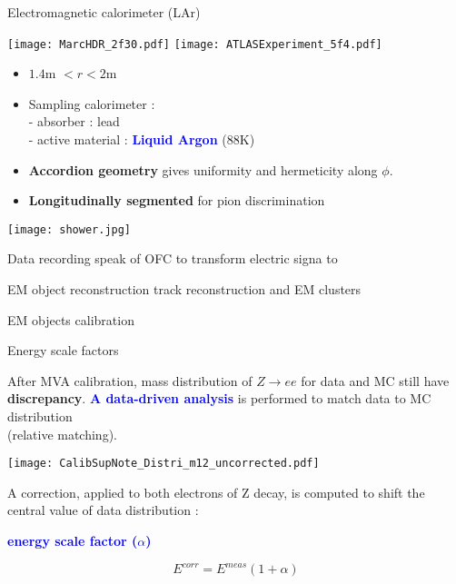 \documentclass[a4paper]{beamer}
\begin{document}
\begin{frame}{ Electromagnetic calorimeter (LAr) }
  \begin{minipage}{0.4\linewidth}
    \texttt{[image: MarcHDR\_2f30.pdf]}\newline
    \centering
    \texttt{[image: ATLASExperiment\_5f4.pdf]}
  \end{minipage}
  \hfill
  \begin{minipage}{0.59\linewidth}
    \begin{itemize}
    \item $1.4$m $<r<2$m
    \item Sampling calorimeter : \\
      - absorber : lead\\
      - active material : \textcolor{blue}{\bf Liquid Argon }($88$K)\\
    \item {\bf Accordion geometry} gives uniformity and hermeticity along $\phi$.
    \item {\bf Longitudinally segmented} for pion discrimination
      
    \end{itemize}
    \centering
    \texttt{[image: shower.jpg]}
  \end{minipage}
\end{frame}

\begin{frame}{Data recording}
  speak of OFC to transform electric signa to 
  \end{frame}
\begin{frame}{EM object reconstruction}
  track reconstruction and EM clusters
\end{frame}
\begin{frame}{EM objects calibration}
\end{frame}
\begin{frame}{Energy scale factors}
  \begin{minipage}{0.49\linewidth}
    After MVA calibration, mass distribution of $Z\rightarrow ee$ for data and MC still have \\{\bf discrepancy}.
    \newline
    \textcolor{blue}{\bf A data-driven analysis } is performed to match data to MC distribution \\(relative matching).
  \end{minipage}
  \hfill
  \begin{minipage}{0.49\linewidth}
    \texttt{[image: CalibSupNote\_Distri\_m12\_uncorrected.pdf]}
  \end{minipage}

A correction, applied to both electrons of Z decay, is computed to shift the central value of data distribution : 
\begin{center} \textcolor{blue}{\bf energy scale factor ($\alpha$)} \end{center}
$$E^{corr}=E^{meas}(1+\alpha)$$
\end{frame}
\end{document}
